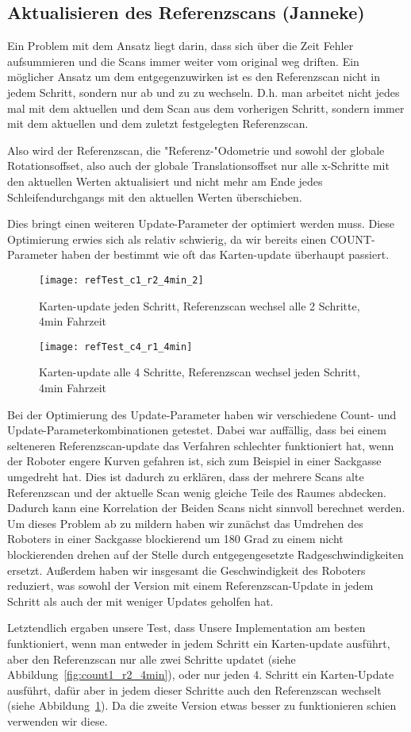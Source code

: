 \subsection{Aktualisieren des Referenzscans (Janneke)}

Ein Problem mit dem Ansatz liegt darin, dass sich über die Zeit Fehler aufsummieren und die Scans immer weiter vom original weg driften. Ein möglicher Ansatz um dem entgegenzuwirken ist es den Referenzscan nicht in jedem Schritt, sondern nur ab und zu zu wechseln. D.h. man arbeitet nicht jedes mal mit dem aktuellen und dem Scan aus dem vorherigen Schritt, sondern immer mit dem aktuellen und dem zuletzt festgelegten Referenzscan.

Also wird der Referenzscan, die "Referenz-"Odometrie und sowohl der globale Rotationsoffset, also auch der globale Translationsoffset nur alle x-Schritte mit den aktuellen Werten aktualisiert und nicht mehr am Ende jedes Schleifendurchgangs mit den aktuellen Werten überschieben. 

Dies bringt einen weiteren Update-Parameter der optimiert werden muss. Diese Optimierung erwies sich als relativ schwierig, da wir bereits einen COUNT-Parameter haben der bestimmt wie oft das Karten-update überhaupt passiert.

\begin{figure}
	\centering
	\texttt{[image: refTest\_c1\_r2\_4min\_2]}
	\caption{Karten-update jeden Schritt, Referenzscan wechsel alle 2 Schritte, 4min Fahrzeit\newline}
	\label{fig:count1_r2_4min}
	\texttt{[image: refTest\_c4\_r1\_4min]}
	\caption{Karten-update alle 4 Schritte, Referenzscan wechsel jeden Schritt, 4min Fahrzeit}
	\label{fig:count4_r1_4min}
\end{figure}

Bei der Optimierung des Update-Parameter haben wir verschiedene Count- und Update-Parameterkombinationen getestet. Dabei war auffällig, dass bei einem selteneren Referenzscan-update das Verfahren schlechter funktioniert hat, wenn der Roboter engere Kurven gefahren ist, sich zum Beispiel in einer Sackgasse umgedreht hat. Dies ist dadurch zu erklären, dass der mehrere Scans alte Referenzscan und der aktuelle Scan wenig gleiche Teile des Raumes abdecken. Dadurch kann eine Korrelation der Beiden Scans nicht sinnvoll berechnet werden. Um dieses Problem ab zu mildern haben wir zunächst das Umdrehen des Roboters in einer Sackgasse blockierend um 180 Grad zu einem nicht blockierenden drehen auf der Stelle durch entgegengesetzte Radgeschwindigkeiten ersetzt. Außerdem haben wir insgesamt die Geschwindigkeit des Roboters reduziert, was sowohl der Version mit einem Referenzscan-Update in jedem Schritt als auch der mit weniger Updates geholfen hat.

Letztendlich ergaben unsere Test, dass Unsere Implementation am besten funktioniert, wenn man entweder in jedem Schritt ein Karten-update ausführt, aber den Referenzscan nur alle zwei Schritte updatet (siehe Abbildung~\ref{fig:count1_r2_4min}), oder nur jeden 4. Schritt ein Karten-Update ausführt, dafür aber in jedem dieser Schritte auch den Referenzscan wechselt (siehe Abbildung~\ref{fig:count4_r1_4min}). Da die zweite Version etwas besser zu funktionieren schien verwenden wir diese.